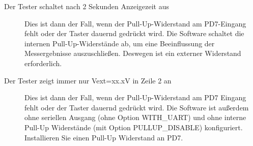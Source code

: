\begin{description}
\item[Der Tester schaltet nach 2 Sekunden Anzeigezeit aus]  
Dies ist dann der Fall, wenn der Pull-Up-Widerstand am PD7-Eingang
fehlt oder der Taster dauernd gedrückt wird. 
Die Software schaltet die internen Pull-Up-Widerstände ab, um eine Beeinflussung
der Messergebnisse auszuschließen. Deswegen ist ein externer Widerstand erforderlich.

\item[Der Tester zeigt immer nur Vext=xx.xV in Zeile 2 an]
Dies ist dann der Fall, wenn der Pull-Up-Widerstand am PD7 Eingang
fehlt oder der Taster dauernd gedrückt wird.
Die Software ist außerdem ohne seriellen Ausgang (ohne Option WITH\_UART) und
ohne interne Pull-Up Widerstände (mit Option PULLUP\_DISABLE) konfiguriert.
Installieren Sie einen Pull-Up Widerstand an PD7.

\end{description}

